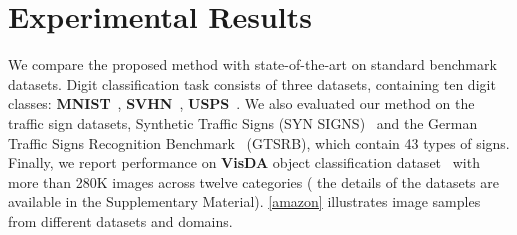 \documentclass[10pt,letterpaper]{article}
\begin{document}
\begin{comment}
\subsection{Connection to MCD Approach}
Perhaps the most related to our proposed method is the Maximum Classifier Discrepancy Algorithm (\textbf{MCDA})~\cite{saito2018}, that proposed directly optimizing the classifier discrepancy measure  in the context of deep neural networks.  
Our approach also has a discrepancy minimization term over
the predictions for target samples but the core idea in our approach is fundamentally different where
we model the classifier as a random function and treat the posterior distribution of the classifier given training data, as the hypothesis space of the classifiers. This results in a simple \textit{non-adversarial} large margin
posterior separation problem, leading to highly stable convergence to a desirable solution in contrast to \textbf{MCDA} using adversarial approaches which are difficult to optimize with gradient descent and they often do not converge well
without careful hyperparameter tuning and proper initialization. 
\end{comment}




\section{Experimental Results}\label{sec:expmt}
We compare the proposed method with state-of-the-art on standard benchmark datasets.  Digit classification task consists of three datasets, containing ten digit classes: \textbf{MNIST}~\cite{lecun1998gradient}, \textbf{SVHN}~\cite{netzer2011reading}, \textbf{USPS}~\cite{tzeng2017adversarial}. 
We also evaluated our method on the traffic sign datasets, Synthetic Traffic Signs (SYN SIGNS)~\cite{moiseev2013evaluation} and the German Traffic Signs Recognition Benchmark~\cite{stallkamp2011german} (GTSRB), which contain 43 types of signs. Finally, we report performance on  \textbf{VisDA} object classification dataset~\cite{peng2017visda} with more than 280K images across twelve categories ( the details of the datasets are available in the Supplementary Material).  \autoref{amazon} illustrates image samples from different datasets and domains.
\end{document}
